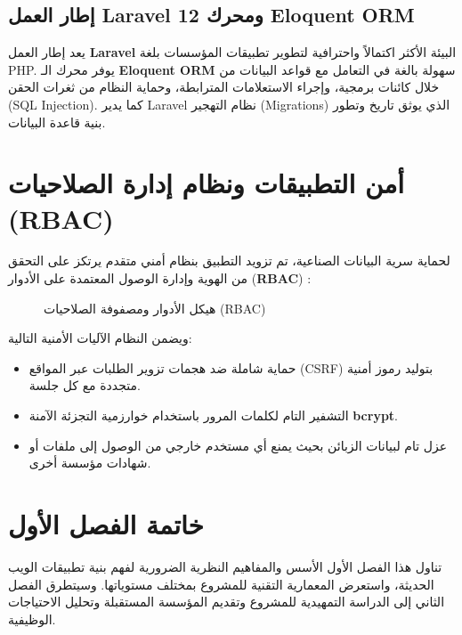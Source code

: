 \documentclass{bts-report-ar}
\begin{document}
\subsection{إطار العمل Laravel 12 ومحرك Eloquent ORM}
يعد إطار العمل \textbf{Laravel} البيئة الأكثر اكتمالاً واحترافية لتطوير تطبيقات المؤسسات بلغة PHP. يوفر محرك الـ \textbf{Eloquent ORM} سهولة بالغة في التعامل مع قواعد البيانات من خلال كائنات برمجية، وإجراء الاستعلامات المترابطة، وحماية النظام من ثغرات الحقن (SQL Injection). كما يدير Laravel نظام التهجير (Migrations) الذي يوثق تاريخ وتطور بنية قاعدة البيانات.

\section{أمن التطبيقات ونظام إدارة الصلاحيات (RBAC)}
لحماية سرية البيانات الصناعية، تم تزويد التطبيق بنظام أمني متقدم يرتكز على التحقق من الهوية وإدارة الوصول المعتمدة على الأدوار (\textbf{RBAC}) :

\begin{figure}[H]
  \centering
  \begin{LTR}
  
  \end{LTR}
  \caption{هيكل الأدوار ومصفوفة الصلاحيات (RBAC)}
  \label{fig:rbac-model}
\end{figure}

ويضمن النظام الآليات الأمنية التالية:
\begin{itemize}
  \item حماية شاملة ضد هجمات تزوير الطلبات عبر المواقع (CSRF) بتوليد رموز أمنية متجددة مع كل جلسة.
  \item التشفير التام لكلمات المرور باستخدام خوارزمية التجزئة الآمنة \textbf{bcrypt}.
  \item عزل تام لبيانات الزبائن بحيث يمنع أي مستخدم خارجي من الوصول إلى ملفات أو شهادات مؤسسة أخرى.
\end{itemize}

\section*{خاتمة الفصل الأول}
تناول هذا الفصل الأول الأسس والمفاهيم النظرية الضرورية لفهم بنية تطبيقات الويب الحديثة، واستعرض المعمارية التقنية للمشروع بمختلف مستوياتها. وسيتطرق الفصل الثاني إلى الدراسة التمهيدية للمشروع وتقديم المؤسسة المستقبلة وتحليل الاحتياجات الوظيفية.


\end{document}
